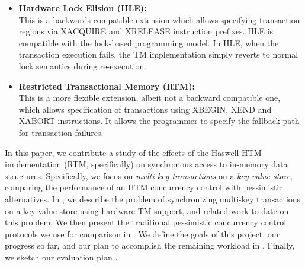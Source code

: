 \begin{itemize} 
\item \textbf{Hardware Lock Elision (HLE):} \\ This is a backwards-compatible
  extension which allows specifying transaction regions via \textrm{XACQUIRE}
  and \textrm{XRELEASE} instruction prefixes. HLE is compatible with the
  lock-based programming model. In HLE, when the transaction execution fails,
  the TM implementation simply reverts to normal lock semantics during
  re-execution. \\
\item \textbf{Restricted Transactional Memory (RTM):} \\ This is a more flexible
  extension, albeit not a backward compatible one, which allows specification of
  transactions using \textrm{XBEGIN, XEND and XABORT} instructions. It allows
  the programmer to specify the fallback path for transaction failures. \\
\end{itemize}

In this paper, we contribute a study of the effects of the Haswell HTM
implementation (RTM, specifically) on synchronous access to in-memory data
structures. Specifically, we focus on \textit{multi-key transactions} on a
\textit{key-value store}, comparing the performance of an HTM concurrency
control with pessimistic alternatives. In , we describe the problem
of synchronizing multi-key transactions on a key-value store using hardware TM
support, and related work to date on this problem. We then present the
traditional pessimistic concurrency control protocols we use for comparison in
. We define the goals of this project, our progress so
far, and our plan to accomplish the remaining workload in . Finally, we sketch our evaluation plan .
